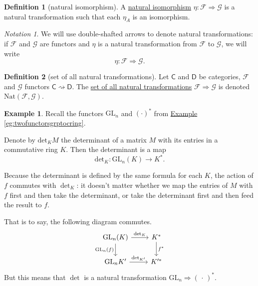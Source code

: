 \documentclass[a4paper]{report}
\newcommand{\defn}[1]{\ul{#1}}
\newcommand{\GL}{\mathrm{GL}}
\newcommand{\Nat}{\mathrm{Nat}}
\theoremstyle{definition}
\newtheorem{definition}{Definition}[section]
\newtheorem{example}{Example}[section]
\theoremstyle{plain}
\theoremstyle{remark}
\newtheorem{notation}{Notation}[section]
\begin{document}
\begin{definition}[natural isomorphism]
  \label{def:naturalisomorphism}
  A \defn{natural isomorphism} $\eta\colon \mathcal{F} \Rightarrow \mathcal{G}$ is a natural transformation such that each $\eta_{A}$ is an isomorphism.
\end{definition}


\begin{notation}
  We will use double-shafted arrows to denote natural transformations: if $\mathcal{F}$ and $\mathcal{G}$ are functors and $\eta$ is a natural transformation from $\mathcal{F}$ to $\mathcal{G}$, we will write
  \begin{equation*}
    \eta\colon \mathcal{F} \Rightarrow \mathcal{G}.
  \end{equation*}
\end{notation}

\begin{definition}[set of all natural transformations]
  \label{def:setofallnaturaltransformations}
  Let $\mathsf{C}$ and $\mathsf{D}$ be categories, $\mathcal{F}$ and $\mathcal{G}$ functors $\mathsf{C} \rightsquigarrow \mathsf{D}$. The \defn{set of all natural transformations} $\mathcal{F} \Rightarrow \mathcal{G}$ is denoted $\Nat(\mathcal{F}, \mathcal{G})$.
\end{definition} 

\begin{example}
  Recall the functors $\mathrm{GL}_{n}$ and $(\cdot)^{*}$ from \hyperref[eg:twofunctorsgrptocring]{Example \ref*{eg:twofunctorsgrptocring}}.

  Denote by $\mathrm{det}_{K}M$ the determinant of a matrix $M$ with its entries in a commutative ring $K$. Then the determinant is a map
  \begin{equation*}
    \mathrm{det}_{K}\colon \GL_{n}(K) \to K^{*}.
  \end{equation*}

  Because the determinant is defined by the same formula for each $K$, the action of $f$ commutes with $\det_{K}$: it doesn't matter whether we map the entries of $M$ with $f$ first and then take the determinant, or take the determinant first and then feed the result to $f$.

  That is to say, the following diagram commutes.
  \begin{equation*}
    \begin{tikzcd}
      \GL_{n}(K)
      \arrow[r, "\det_{K}"]
      \arrow[d, swap, "\GL_{n}(f)"]
      & K^{*}
      \arrow[d, "f^{*}"]
      \\
      \GL_{n}K'
      \arrow[r, "\det_{K'}"]
      & K'^{*}
    \end{tikzcd}
  \end{equation*}
  But this means that $\det$ is a natural transformation $\GL_{n} \Rightarrow \mathrm{(\,\cdot\,)^{*}}$.
\end{example}
\end{document}
